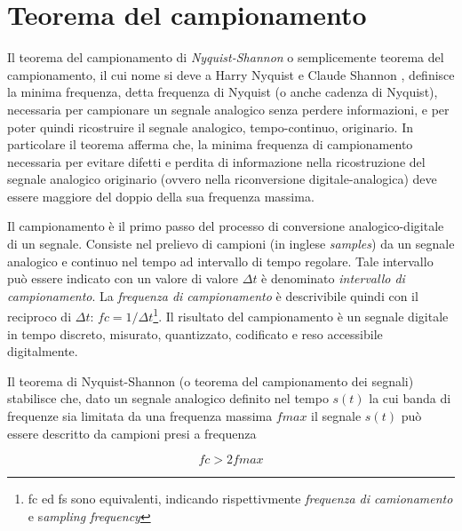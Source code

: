 
\section{Teorema del campionamento}

Il teorema del campionamento di \emph{Nyquist-Shannon} o semplicemente teorema del
campionamento, il cui nome si deve a Harry Nyquist  e
Claude Shannon , definisce la minima frequenza, detta
frequenza di Nyquist (o anche cadenza di Nyquist), necessaria per campionare un
segnale analogico senza perdere informazioni, e per poter quindi ricostruire il
segnale analogico, tempo-continuo, originario.
In particolare il teorema afferma che,
la minima frequenza di campionamento necessaria per evitare difetti e perdita di
informazione nella ricostruzione del segnale analogico originario (ovvero nella
riconversione digitale-analogica) deve essere maggiore del doppio della sua
frequenza massima.

Il campionamento è il primo passo del processo di conversione analogico-digitale
di un segnale. Consiste nel prelievo di campioni (in inglese \emph{samples}) da
un segnale analogico e continuo nel tempo ad intervallo di tempo regolare.
Tale intervallo può essere indicato con un valore di valore $\Delta t$ è denominato
\emph{intervallo di campionamento}. La \emph{frequenza di campionamento} è
descrivibile quindi con il reciproco di
$ \Delta t $: $ fc = 1/\Delta t $\footnote{fc ed fs sono equivalenti,
indicando rispettivmente \emph{frequenza di camionamento} e s\emph{ampling frequency}}.
Il risultato del campionamento è un segnale digitale in tempo discreto,
misurato, quantizzato, codificato e reso accessibile digitalmente.

Il teorema di Nyquist-Shannon (o teorema del campionamento dei segnali) stabilisce
che, dato un segnale analogico definito nel tempo $s(t)$ la cui banda di frequenze
sia limitata da una frequenza massima $fmax$ il segnale $s(t)$ può essere descritto
da campioni presi a frequenza

\begin{equation}
\label{sampling}
fc > 2fmax
\end{equation}

\clearpage
